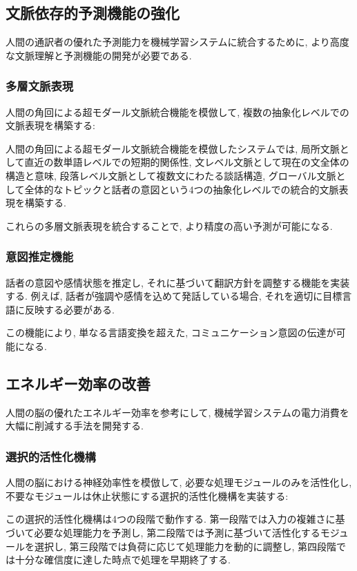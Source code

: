 \subsection{文脈依存的予測機能の強化}

人間の通訳者の優れた予測能力を機械学習システムに統合するために, より高度な文脈理解と予測機能の開発が必要である.

\subsubsection{多層文脈表現}

人間の角回による超モダール文脈統合機能を模倣して, 複数の抽象化レベルでの文脈表現を構築する:

人間の角回による超モダール文脈統合機能を模倣したシステムでは, 局所文脈として直近の数単語レベルでの短期的関係性, 文レベル文脈として現在の文全体の構造と意味, 段落レベル文脈として複数文にわたる談話構造, グローバル文脈として全体的なトピックと話者の意図という4つの抽象化レベルでの統合的文脈表現を構築する.

これらの多層文脈表現を統合することで, より精度の高い予測が可能になる.

\subsubsection{意図推定機能}

話者の意図や感情状態を推定し, それに基づいて翻訳方針を調整する機能を実装する.
例えば, 話者が強調や感情を込めて発話している場合, それを適切に目標言語に反映する必要がある.

この機能により, 単なる言語変換を超えた, コミュニケーション意図の伝達が可能になる.

\subsection{エネルギー効率の改善}

人間の脳の優れたエネルギー効率を参考にして, 機械学習システムの電力消費を大幅に削減する手法を開発する.

\subsubsection{選択的活性化機構}

人間の脳における神経効率性を模倣して, 必要な処理モジュールのみを活性化し, 不要なモジュールは休止状態にする選択的活性化機構を実装する:

この選択的活性化機構は4つの段階で動作する.
第一段階では入力の複雑さに基づいて必要な処理能力を予測し, 第二段階では予測に基づいて活性化するモジュールを選択し, 第三段階では負荷に応じて処理能力を動的に調整し, 第四段階では十分な確信度に達した時点で処理を早期終了する.


